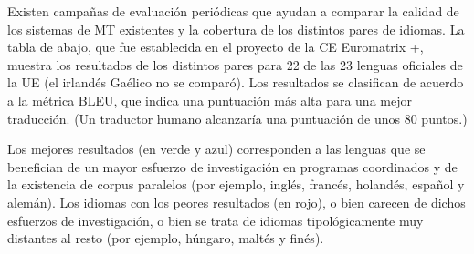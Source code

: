 \begin{multicols}{2}
Existen campañas de evaluación periódicas que ayudan a comparar la calidad de los sistemas de MT existentes y la cobertura de los distintos pares de idiomas. La tabla de abajo, que fue establecida en el proyecto de la CE Euromatrix +, muestra los resultados de los distintos pares para 22 de las 23 lenguas oficiales de la UE (el irlandés Gaélico no se comparó). Los resultados se clasifican de acuerdo a la métrica BLEU, que indica una puntuación más alta para una mejor traducción. (Un traductor humano alcanzaría una puntuación de unos 80 puntos.)

Los mejores resultados (en verde y azul) corresponden a las lenguas que se benefician de un mayor esfuerzo de investigación en programas coordinados y de la existencia de corpus paralelos (por ejemplo, inglés, francés, holandés, español y alemán). Los idiomas con los peores resultados (en rojo), o bien carecen de dichos esfuerzos de investigación, o bien se trata de idiomas tipológicamente muy distantes al resto (por ejemplo, húngaro, maltés y finés).


\end{multicols}

